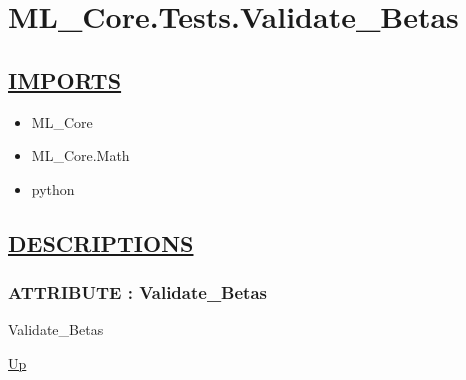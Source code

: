 \chapter*{ML\_Core.Tests.Validate\_Betas}
\hypertarget{ecldoc:toc:ML_Core.Tests.Validate_Betas}{}

\section*{\underline{IMPORTS}}
\begin{itemize}
\item ML\_Core
\item ML\_Core.Math
\item python
\end{itemize}

\section*{\underline{DESCRIPTIONS}}
\subsection*{ATTRIBUTE : Validate\_Betas}
\hypertarget{ecldoc:ml_core.tests.validate_betas}{}
\begin{minipage}[t]{\textwidth}
\begin{flushleft}
 Validate\_Betas 
\end{flushleft}
\end{minipage}
\hyperlink{ecldoc:toc:ML_Core/Tests}{Up}

\par
\par
